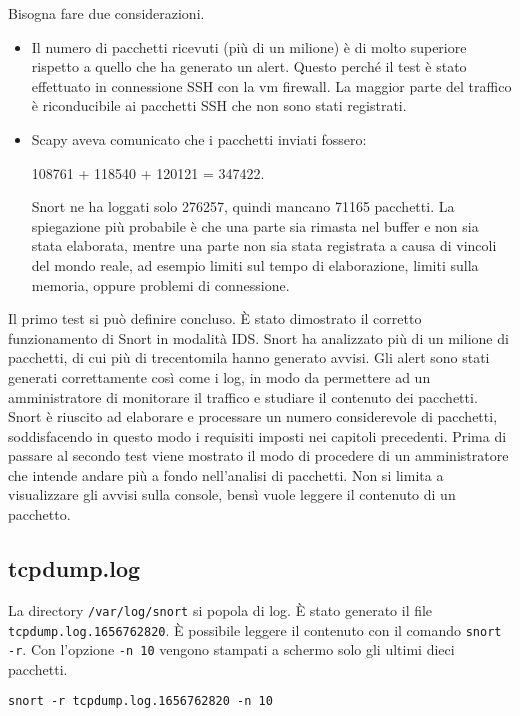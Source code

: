 Bisogna fare due considerazioni.
\begin{itemize}
    \item Il numero di pacchetti ricevuti (più di un milione) è di molto superiore rispetto a quello che ha generato un alert. Questo perché il test è stato effettuato in connessione SSH con la vm firewall. La maggior parte del traffico è riconducibile ai pacchetti SSH che non sono stati registrati.
    \item Scapy aveva comunicato che i pacchetti inviati fossero:

          108761 + 118540 + 120121 = 347422.

          Snort ne ha loggati solo 276257, quindi mancano 71165 pacchetti. La spiegazione più probabile è che una parte sia rimasta nel buffer e non sia stata elaborata, mentre una parte non sia stata registrata a causa di vincoli del mondo reale, ad esempio limiti sul tempo di elaborazione, limiti sulla memoria, oppure problemi di connessione.
\end{itemize}

Il primo test si può definire concluso. È stato dimostrato il corretto funzionamento di Snort in modalità IDS. Snort ha analizzato più di un milione di pacchetti, di cui più di trecentomila hanno generato avvisi. Gli alert sono stati generati correttamente così come i log, in modo da permettere ad un amministratore di monitorare il traffico e studiare il contenuto dei pacchetti. Snort è riuscito ad elaborare e processare un numero considerevole di pacchetti, soddisfacendo in questo modo i requisiti imposti nei capitoli precedenti.
Prima di passare al secondo test viene mostrato il modo di procedere di un amministratore che intende andare più a fondo nell'analisi di pacchetti. Non si limita a visualizzare gli avvisi sulla console, bensì vuole leggere il contenuto di un pacchetto.

\subsection{tcpdump.log}

La directory \texttt{/var/log/snort} si popola di log. È stato generato il file \texttt{tcpdump.log.1656762820}. È possibile leggere il contenuto con il comando \texttt{snort -r}. Con l'opzione \texttt{-n 10} vengono stampati a schermo solo gli ultimi dieci pacchetti.

\begin{verbatim}
snort -r tcpdump.log.1656762820 -n 10
\end{verbatim}

